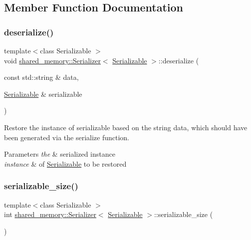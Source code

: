 \subsection{Member Function Documentation}
\mbox{\label{classshared__memory_1_1Serializer_a8f674c9b3a7c053403112d2fad4e09a9}} 
\subsubsection{\texorpdfstring{deserialize()}{deserialize()}}
{\footnotesize\ttfamily template$<$class Serializable $>$ \\
void \hyperlink{classshared__memory_1_1Serializer}{shared\+\_\+memory\+::\+Serializer}$<$ \hyperlink{classSerializable}{Serializable} $>$\+::deserialize (\begin{DoxyParamCaption}\item[{const std\+::string \&}]{data,  }\item[{\hyperlink{classSerializable}{Serializable} \&}]{serializable }\end{DoxyParamCaption})}



Restore the instance of serializable based on the string data, which should have been generated via the serialize function. 


\begin{DoxyParams}{Parameters}
{\em the} & serialized instance \\
\hline
{\em instance} & of \hyperlink{classSerializable}{Serializable} to be restored \\
\hline
\end{DoxyParams}
\mbox{\label{classshared__memory_1_1Serializer_af5edd0af254d6061e8e18c0bbec10aa9}} 
\subsubsection{\texorpdfstring{serializable\+\_\+size()}{serializable\_size()}}
{\footnotesize\ttfamily template$<$class Serializable $>$ \\
int \hyperlink{classshared__memory_1_1Serializer}{shared\+\_\+memory\+::\+Serializer}$<$ \hyperlink{classSerializable}{Serializable} $>$\+::serializable\+\_\+size (\begin{DoxyParamCaption}{ }\end{DoxyParamCaption})\hspace{0.3cm}{\ttfamily [static]}}



